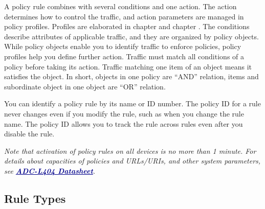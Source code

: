 A policy rule combines with several conditions and one action. The action determines how to control the traffic, and action parameters are managed in policy profiles. 
Profiles are elaborated in chapter \hyperlink{link:Certificate Managements}{\color{linkblue}{Certificate Managements}}  and chapter \hyperlink{link:Proxy Profiles}{\color{linkblue}{Proxy Profiles}}. 
The conditions describe attributes of applicable traffic, and they are organized by policy objects. 
While policy objects enable you to identify traffic to enforce policies, policy profiles help you define further action.  Traffic must match all conditions of a policy before taking its action. 
Traffic matching one item of an object means it satisfies the object. In short, objects in one policy are “AND” relation, items and subordinate object in one object are “OR” relation. 


You can identify a policy rule by its name or ID number. The policy ID for a rule never changes even if you modify the rule, such as when you change the rule name. 
The policy ID allows you to track the rule across rules even after you disable the rule.


\notemark\textit{Note that activation of policy rules on all devices is no more than 1 minute. 
For details about capacities of policies and URLs/URIs, and other system parameters, see \textcolor{darkblue}{\textbf{\underline{ADC-L404 Datasheet}}}.}

\subsection*{\hypertarget{link:Rule Types}{Rule Types}}
\label{sec:policies:concepts:types}

